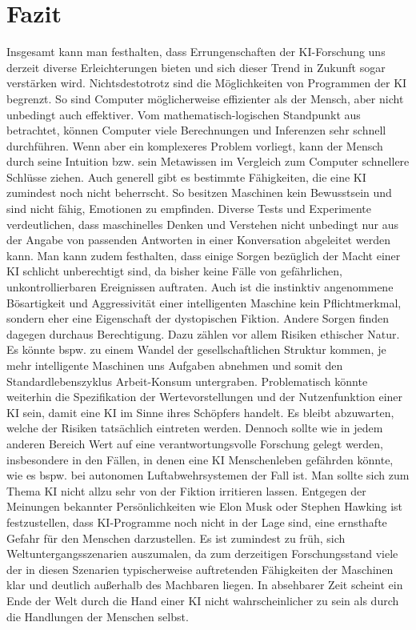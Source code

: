 \section{Fazit}
Insgesamt kann man festhalten, dass Errungenschaften der KI-Forschung uns derzeit diverse Erleichterungen bieten und sich dieser Trend in Zukunft sogar verstärken wird.
Nichtsdestotrotz sind die Möglichkeiten von Programmen der KI begrenzt.
So sind Computer möglicherweise effizienter als der Mensch, aber nicht unbedingt auch effektiver.
Vom mathematisch-logischen Standpunkt aus betrachtet, können Computer viele Berechnungen und Inferenzen sehr schnell durchführen.
Wenn aber ein komplexeres Problem vorliegt, kann der Mensch durch seine Intuition bzw.
sein Metawissen im Vergleich zum Computer schnellere Schlüsse ziehen.
Auch generell gibt es bestimmte Fähigkeiten, die eine KI zumindest noch nicht beherrscht.
So besitzen Maschinen kein Bewusstsein und sind nicht fähig, Emotionen zu empfinden.
Diverse Tests und Experimente verdeutlichen, dass maschinelles Denken und Verstehen nicht unbedingt nur aus der Angabe von passenden Antworten in einer Konversation abgeleitet werden kann.
Man kann zudem festhalten, dass einige Sorgen bezüglich der Macht einer KI schlicht unberechtigt sind, da bisher keine Fälle von gefährlichen, unkontrollierbaren Ereignissen auftraten.
Auch ist die instinktiv angenommene Bösartigkeit und Aggressivität einer intelligenten Maschine kein Pflichtmerkmal, sondern eher eine Eigenschaft der dystopischen Fiktion.
Andere Sorgen finden dagegen durchaus Berechtigung.
Dazu zählen vor allem Risiken ethischer Natur.
Es könnte bspw.
zu einem Wandel der gesellschaftlichen Struktur kommen, je mehr intelligente Maschinen uns Aufgaben abnehmen und somit den Standardlebenszyklus Arbeit-Konsum untergraben.
Problematisch könnte weiterhin die Spezifikation der Wertevorstellungen und der Nutzenfunktion einer KI sein, damit eine KI im Sinne ihres Schöpfers handelt.
Es bleibt abzuwarten, welche der Risiken tatsächlich eintreten werden.
Dennoch sollte wie in jedem anderen Bereich Wert auf eine verantwortungsvolle Forschung gelegt werden, insbesondere in den Fällen, in denen eine KI Menschenleben gefährden könnte, wie es bspw.
bei autonomen Luftabwehrsystemen der Fall ist.
Man sollte sich zum Thema KI nicht allzu sehr von der Fiktion irritieren lassen.
Entgegen der Meinungen bekannter Persönlichkeiten wie Elon Musk oder Stephen Hawking ist festzustellen, dass KI-Programme noch nicht in der Lage sind, eine ernsthafte Gefahr für den Menschen darzustellen.
Es ist zumindest zu früh, sich Weltuntergangsszenarien auszumalen, da zum derzeitigen Forschungsstand viele der in diesen Szenarien typischerweise auftretenden Fähigkeiten der Maschinen klar und deutlich außerhalb des Machbaren liegen.
In absehbarer Zeit scheint ein Ende der Welt durch die Hand einer KI nicht wahrscheinlicher zu sein als durch die Handlungen der Menschen selbst.

